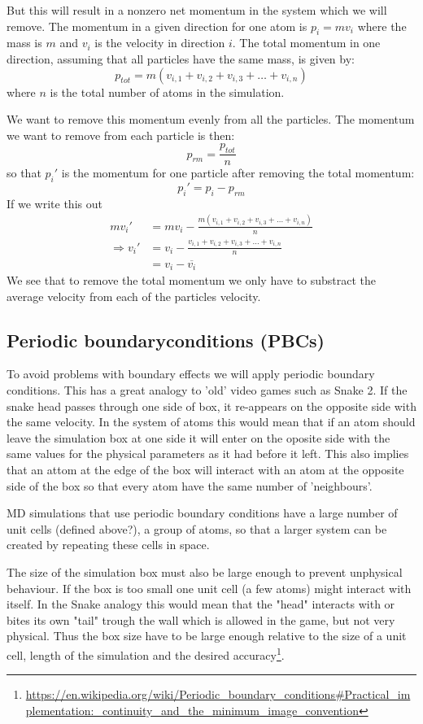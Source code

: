 \documentclass[11pt,a4wide]{article}
\begin{document}
But this will result in a nonzero net momentum in the system which we will remove. The momentum in a given direction for one atom is $p_{i} = mv_i$ where the mass is $m$ and $v_i$ is the velocity in direction $i$. The total momentum in one direction, assuming that all particles have the same mass, is given by:
\[
p_{tot} = m(v_{i,1} + v_{i,2} + v_{i,3} + \dots + v_{i,n})
\]
where $n$ is the total number of atoms in the simulation. 

We want to remove this momentum evenly from all the particles. The momentum we want to remove from each particle is then:
\[
p_{rm} = \frac{p_{tot}}{n}
\]
so that $p_i'$ is the momentum for one particle after removing the total momentum:
\[
p_i' = p_i - p_{rm} 
\]
If we write this out
\begin{align*}
mv_i' &= mv_i - \frac{m(v_{i,1} + v_{i,2} + v_{i,3} + \dots + v_{i,n})}{n} \\
\Rightarrow v_i' &= v_i - \frac{v_{i,1} + v_{i,2} + v_{i,3} + \dots + v_{i,n}}{n} \\
&= v_i - \overline{v_i}
\end{align*}
We see that to remove the total momentum we only have to substract the average velocity from each of the particles velocity. 

\subsection{Periodic boundaryconditions (PBCs)} 
To avoid problems with boundary effects we will apply periodic boundary conditions. This has a great analogy to 'old' video games such as Snake 2. If the snake head passes through one side of box, it re-appears on the opposite side with the same velocity. In the system of atoms this would mean that if an atom should leave the simulation box at one side it will enter on the oposite side with the same values for the physical parameters as it had before it left. This also implies that an attom at the edge of the box will interact with an atom at the opposite side of the box so that every atom have the same number of 'neighbours'. 

MD simulations that use periodic boundary conditions have a large number of unit cells (defined above?), a group of atoms, so that a larger system can be created by repeating these cells in space. 

The size of the simulation box must also be large enough to prevent unphysical behaviour. If the box is too small one unit cell (a few atoms) might interact with itself. In the Snake analogy this would mean that the "head" interacts with or bites its own "tail" trough the wall which is allowed in the game, but not very physical. Thus the box size have to be large enough relative to the size of a unit cell, length of the simulation and the desired accuracy\footnote{\url{https://en.wikipedia.org/wiki/Periodic\_boundary\_conditions\#Practical\_implementation:\_continuity\_and\_the\_minimum\_image\_convention}}.
\end{document}
